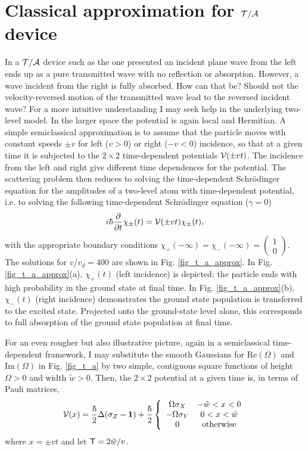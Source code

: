 \section{Classical approximation for ${\cal T/A}$ device \label{sec:chapter3_class}}
%
%
In a ${\cal T/A}$ device such as the one presented an incident plane wave from the left ends up as a pure transmitted wave with no reflection or absorption.
However, a wave incident from the right is fully absorbed. How can that be? Should not the velocity-reversed motion
of the transmitted wave lead to the reversed incident wave?
For a more intuitive understanding I may seek help in the underlying two-level model.
In the larger space the potential is again local and Hermitian. A simple semiclassical
approximation is to assume that the particle moves with  constant speeds $\pm v$ for left ($v>0$) or right ($-v<0$) incidence,  so that at a given time it is subjected to  the $2\times2$ time-dependent potentials
${\cal V}(\pm vt)$. The incidence from the left and right give different time dependences for the potential. The scattering problem then reduces to solving the time-dependent Schr\"odinger equation for the amplitudes of a two-level atom with time-dependent potential, i.e. to solving the following time-dependent Schr\"odinger equation ($\gamma = 0$)
%
\begin{eqnarray}
  i \hbar \frac{\partial}{\partial t} \chi_\pm(t)
  = {\cal V} (\pm v t) \chi_\pm(t),
\end{eqnarray}
%
with the appropriate boundary conditions $\chi_+ (-\infty) = \chi_- (-\infty) =\left(\begin{smallmatrix} 1\\ 0\end{smallmatrix}\right)$. The  solutions for $v/v_d = 400$
are shown in Fig. \ref{fig_t_a_approx}.
In Fig. \ref{fig_t_a_approx}(a), $\chi_+ (t)$ (left incidence) is depicted:  the particle ends  with high probability in the ground state at final time. In Fig. \ref{fig_t_a_approx}(b), $\chi_- (t)$ (right incidence) demonstrates  the ground state population is transferred to the excited state. Projected onto the ground-state level alone,
this corresponds to full absorption of the ground state population at final time.

For an  even rougher but also illustrative picture,  again in a semiclassical time-dependent framework, I  may substitute the smooth Gaussians for Re$(\Omega)$ and Im$(\Omega)$ in Fig. \ref{fig_t_a} by two simple, contiguous square functions of height
$\Omega>0$ and width $\tilde{w} > 0$. Then, the $2\times2$ potential at a given time is, in terms of Pauli matrices,
%
\begin{eqnarray}
  {\cal V} (x) = \frac{\hbar}{2}\Delta (\sigma_Z-{\mathbf 1})+ \frac{\hbar}{2} \left\{\begin{array}{cc}
  \Omega\sigma_X & -\tilde w < x < 0\\
  -\Omega\sigma_Y & 0 < x < \tilde w\\
  0 & \mbox{otherwise}
  \end{array}\right.
\end{eqnarray}
%
where $x = \pm v t$ and let ${\sf T}=2 \tilde w/v$.

